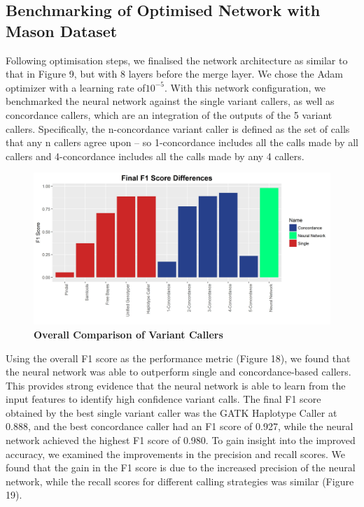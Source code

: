 \documentclass{article}
\begin{document}
\subsection{Benchmarking of Optimised Network with Mason Dataset}
Following optimisation steps, we finalised the network architecture as similar to that in Figure 9, but with 8 layers before the merge layer. We chose the Adam optimizer with a learning rate of$10^{-5}$. With this network configuration, we benchmarked the neural network against the single variant callers, as well as concordance callers, which are an integration of the outputs of the 5 variant callers. Specifically, the n-concordance variant caller is defined as the set of calls that any n callers agree upon -- so 1-concordance includes all the calls made by all callers and 4-concordance includes all the calls made by any 4 callers.
\begin{figure}[H]
\includegraphics[width=\textwidth]{final_f1scores_results_all.jpg}
\caption{\textbf{Overall Comparison of Variant Callers}}
\centering
\end{figure}
Using the overall F1 score as the performance metric (Figure 18), we found that the neural network was able to outperform single and concordance-based callers. This provides strong evidence that the neural network is able to learn from the input features to identify high confidence variant calls. The final F1 score obtained by the best single variant caller was the GATK Haplotype Caller at 0.888, and the best concordance caller had an F1 score of 0.927, while the neural network achieved the highest F1 score of 0.980. To gain insight into the improved accuracy, we examined the improvements in the precision and recall scores. We found that the gain in the F1 score is due to the increased precision of the neural network, while the recall scores for different calling strategies was similar (Figure 19). 
\end{document}
